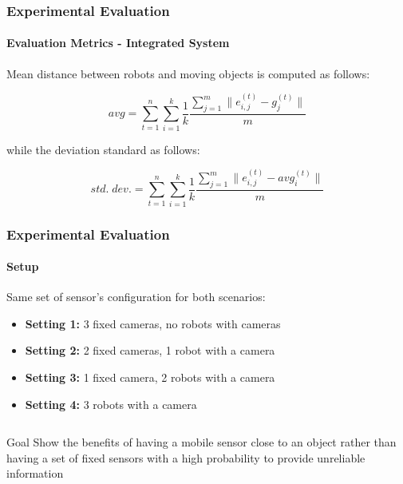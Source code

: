 \begin{frame}
	\frametitle{Experimental Evaluation}
	\framesubtitle{Evaluation Metrics - Integrated System}
	
	\Large
	
	\vspace{0.5cm}
	
	Mean distance between robots and moving objects is computed as follows:
	
	\vspace{-0.4cm}
	
	\begin{equation*}
		avg = \sum_{t=1}^n \sum_{i=1}^k \frac{1}{k} \frac{\sum_{j=1}^m \| e_{i,j}^{(t)} - g_{j}^{(t)} \|}{m}
	\end{equation*}
	
	\vspace{0.4cm}
	
	while the deviation standard as follows:
	
	\vspace{-0.3cm}
	
	\begin{equation*}
		std. \; dev. = \sum_{t=1}^n \sum_{i=1}^k \frac{1}{k} \frac{\sum_{j=1}^m \| e_{i,j}^{(t)} - avg_{i}^{(t)} \|}{m}
	\end{equation*}
\end{frame}

\begin{frame}
	\frametitle{Experimental Evaluation}
	\framesubtitle{Setup}
	
	\Large
	
	\vspace{0.2cm}
	
	Same set of sensor's configuration for both scenarios:
	
	\begin{itemize}
		\item \textbf{Setting 1:} 3 fixed cameras, no robots with cameras
		
		\item \textbf{Setting 2:} 2 fixed cameras, 1 robot with a camera
		
		\item \textbf{Setting 3:} 1 fixed camera, 2 robots with a camera
		
		\item \textbf{Setting 4:} 3 robots with a camera
	\end{itemize}
	
	\vspace{-0.5cm}
	
	\begin{columns}[T]
		
		\begin{block}{Goal}
			Show the benefits of having a mobile sensor close to an object rather than having
			a set of fixed sensors with a high probability to provide unreliable information
		\end{block}
	\end{columns}
\end{frame}

